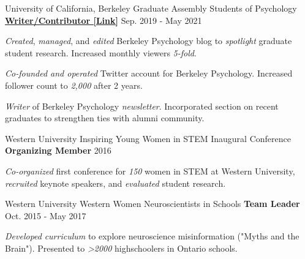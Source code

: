 \begin{cventries}
\begin{cventries}
  \cventry 
    {University of California, Berkeley} %
    {Graduate Assembly Students of Psychology}
    {\href{https://psychblog.berkeley.edu/opinion/2019/09/09/Graduate-School-Advice/}{\textbf{Writer/Contributor [Link]}}} %
    {Sep. 2019 - May 2021} %
    {
      \begin{cvitems} 
      	\item {\textit{Created}, \textit{managed}, and \textit{edited} Berkeley Psychology blog to \textit{spotlight} graduate student research. Increased monthly viewers \textit{5-fold}.}
      	\item {\textit{Co-founded and operated} Twitter account for Berkeley Psychology. Increased follower count to \textit{2,000} after 2 years.}
      	\item {\textit{Writer} of Berkeley Psychology \textit{newsletter}. Incorporated section on recent graduates to strengthen ties with alumni community.}
      \end{cvitems}
    }

\end{cventries}
    

\begin{cventries}
    
  \cventry
    {Western University} %
    {Inspiring Young Women in STEM Inaugural Conference}
    {\textbf{Organizing Member}} %
    {2016} %
    {
      \begin{cvitems} %
        \item {\textit{Co-organized} first conference for \textit{150} women in STEM at Western University, \textit{recruited} keynote speakers, and \textit{evaluated} student research.}
      \end{cvitems}
    }
    
  \cventry
    {Western University}
    {Western Women Neuroscientists in Schools}
  	{\textbf{Team Leader}} %
    {Oct. 2015 - May 2017} %
    {
      \begin{cvitems} %
        \item {\textit{Developed} \textit{curriculum} to explore neuroscience misinformation ("Myths and the Brain"). Presented to \textit{>2000} highschoolers in Ontario schools.}
      \end{cvitems}
    }
    

\end{cventries}
\end{cventries}

